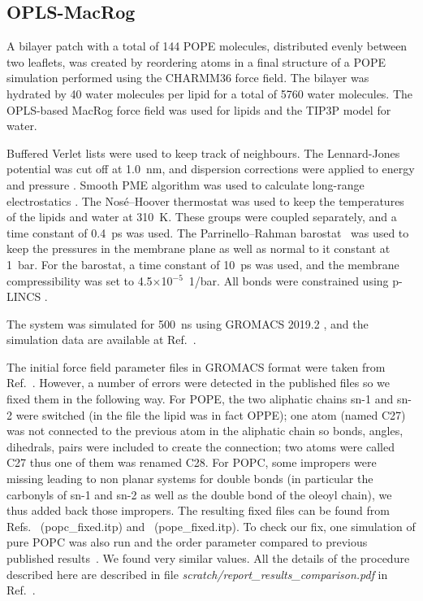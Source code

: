 \documentclass[journal=jpcbfk]{achemso}
\begin{document}
\subsection{OPLS-MacRog}

 A bilayer patch with a total of 144 POPE molecules, distributed evenly between two leaflets, was created by reordering atoms in a final structure of a POPE simulation performed using the CHARMM36 force field. The bilayer was hydrated by 40 water molecules per lipid for a total of 5760 water molecules. The OPLS-based MacRog force field was used \cite{Kulig15b} for lipids and the TIP3P model \cite{jorgensen83} for water. 

Buffered Verlet lists \cite{Pall13} were used to keep track of neighbours. The Lennard-Jones potential was cut off at 1.0~nm, and dispersion corrections were applied to energy and pressure \cite{shirts07}. Smooth PME algorithm was used to calculate long-range electrostatics \cite{darden93,essman95}. The Nos\'{e}--Hoover thermostat was used to keep the temperatures of the lipids and water at 310~K. These groups were coupled separately, and a time constant of 0.4~ps was used. The Parrinello--Rahman barostat~\cite{parrinello81} was used to keep the pressures in the membrane plane as well as normal to it constant at 1~bar. For the barostat, a time constant of 10~ps was used, and the membrane compressibility was set to 4.5$\times$10$^{-5}$~1/bar. All bonds were constrained using p-LINCS \cite{hess97,hess07}.

The system was simulated for 500~ns using GROMACS 2019.2 \cite{abraham2015gromacs}, and the simulation data are available at Ref.~.


 The initial force field parameter files in GROMACS format were taken from Ref.~. 
However, a number of errors were detected in the published files so we fixed them in the following way. 
For POPE, the two aliphatic chains sn-1 and sn-2 were switched (in the file the lipid was in fact OPPE); 
one atom (named C27) was not connected to the previous atom in the aliphatic chain so bonds, angles, dihedrals, 
pairs were included to create the connection; two atoms were called C27 thus one of them was renamed C28. 
For POPC, some impropers were missing leading to non planar systems for double bonds 
(in particular the carbonyls of sn-1 and sn-2 as well as the double bond of the oleoyl chain), 
we thus added back those impropers. The resulting fixed files can be found from Refs.~ (popc\_fixed.itp) and~ (pope\_fixed.itp). 
To check our fix, one simulation of pure POPC was also run and the order parameter compared to previous published results~\cite{botan15}. We found very similar values.
All the details of the procedure described here are described 
in file {\it scratch/report\_results\_comparison.pdf} in Ref.~.
\end{document}
